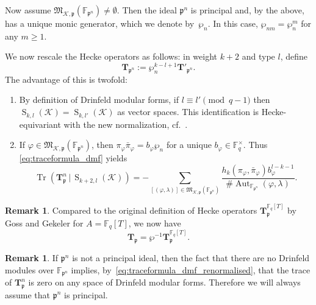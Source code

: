 \documentclass[10pt]{article}
\theoremstyle{definition}
\newtheorem{remark}[theorem]{Remark}
\let\phi\varphi
\DeclareMathOperator\Aut{Aut}
\DeclareMathOperator\Tr{Tr}
\renewcommand{\:}{\colon}
\newcommand{\T}{\mathbf{T}}
\renewcommand{\S}{\operatorname{S}}
\begin{document}
Now assume $\mathfrak M_{\mathcal{K},\mathfrak p}(\mathbb F_{\mathfrak p^n}) \neq \emptyset$. Then the ideal $\mathfrak p^n$ is principal
\cite[Cor.~5.2]{gek_finite} and, by the above, has a unique monic generator, which we denote by~$\wp_n$. In this case, $\wp_{nm} = \wp_n^m$ for any $m \geq 1$.

We now rescale the Hecke operators as follows: in weight $k+2$ and type $l$, define
\[
\T_{\mathfrak p^n} := \wp_n^{k-l+1} \T'_{\mathfrak p^n}.
\]
The advantage of this is twofold:
\begin{enumerate}
    \item By definition of Drinfeld modular forms, if $l \equiv l' \pmod{q-1}$ then $\S_{k,l}({\mathcal K}) = \S_{k,l'}({\mathcal K})$ as vector spaces. This identification is Hecke-equivariant with the new normalization, cf.~\cite[Remarks 5.33 and~6.12]{bockle}.
    \item If $\phi \in \mathfrak M_{\mathcal{K},\mathfrak p}(\mathbb F_{\mathfrak p^n})$, then $\pi_\phi \bar{\pi}_\phi = b_{\phi}\wp_n$ for a unique $b_{\phi} \in \mathbb F_q^\times$. Thus \eqref{eq:traceformula_dmf} yields
    \begin{equation}\label{eq:traceformula_dmf_renormalised}
        \Tr(\T_{\mathfrak p}^n \, | \, \S_{k+2,l}({\mathcal K})) = -\sum_{[(\phi,\lambda)] \in \mathfrak M_{{\mathcal K},\mathfrak p}(\mathbb F_{\mathfrak p^n})} \frac{h_k(\pi_{\phi},\bar{\pi}_{\phi}) b_{\phi}^{l-k-1}}{\# \Aut_{\mathbb F_{\mathfrak p^n}}(\phi,\lambda)}.
    \end{equation}
\end{enumerate}

\begin{remark}
    Compared to the original definition of Hecke operators $\T_{\mathfrak p}^{\mathbb F_q[T]}$ by Goss and Gekeler for $A = \mathbb F_q[T]$, we now have 
    \[
    \T_{\mathfrak p} = \wp^{-1} \T_{\mathfrak p}^{\mathbb F_q[T]}.
    \]
\end{remark}

\begin{remark}
    If $\mathfrak p^n$ is not a principal ideal, then the fact 
    that there are no Drinfeld modules over $\mathbb F_{\mathfrak p^n}$ \cite[Cor.~5.2]{gek_finite} implies, by~\eqref{eq:traceformula_dmf_renormalised}, that the trace of $\T_{\mathfrak p}^n$ is zero on any space of Drinfeld modular forms. Therefore we will always assume that $\mathfrak p^n$ is principal.
\end{remark}
\end{document}
